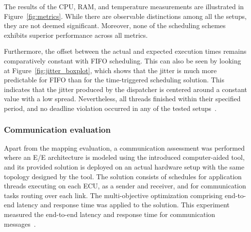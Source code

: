         The results of the CPU, RAM, and temperature measurements are illustrated in Figure~\ref{fig:metrics}. While there are observable distinctions among all the setups, they are not deemed significant. Moreover, none of the scheduling schemes exhibits superior performance across all metrics.

        Furthermore, the offset between the actual and expected execution times remains comparatively constant with FIFO scheduling. This can also be seen by looking at Figure~\ref{fig:jitter_boxplot}, which shows that the jitter is much more predictable for FIFO than for the time-triggered scheduling solution. This indicates that the jitter produced by the dispatcher is centered around a constant value with a low spread.
        Nevertheless, all threads finished within their specified period, and no deadline violation occurred in any of the tested setups~\cite{askaripoor2023designer}.


    
    
    













    
    \subsubsection{Communication evaluation} 
    Apart from the mapping evaluation, a communication assessment was performed where an E/E architecture is modeled using the introduced computer-aided tool, and its provided solution is deployed on an actual hardware setup with the same topology designed by the tool. The solution consists of schedules for application threads executing on each ECU, as a sender and receiver, and for communication tasks routing over each link. The multi-objective optimization comprising end-to-end latency and response time was applied to the solution.   
    This experiment measured the end-to-end latency and response time for communication messages~\cite{askaripoor2023designer}. 
    
